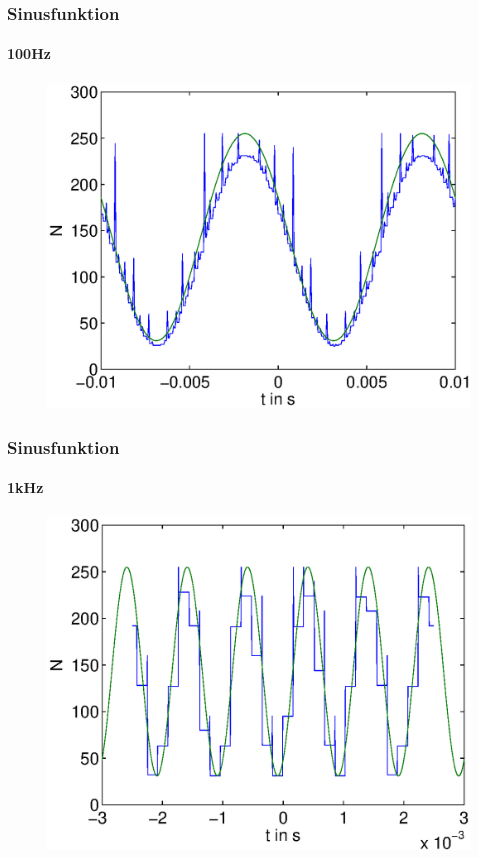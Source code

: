 \begin{frame}
    \frametitle{Sinusfunktion}
    \framesubtitle{100Hz}
     \begin{figure}[H]
     \begin{center}
             \includegraphics[scale=0.5]{./img/graph/Aufgabe3_100hz_N.eps}
     \end{center}
     \end{figure}
\end{frame}
\begin{frame}
    \frametitle{Sinusfunktion}
    \framesubtitle{1kHz}
     \begin{figure}[H]
     \begin{center}
             \includegraphics[scale=0.5]{./img/graph/Aufgabe3_1khz_N.eps}
     \end{center}
     \end{figure}
\end{frame}

